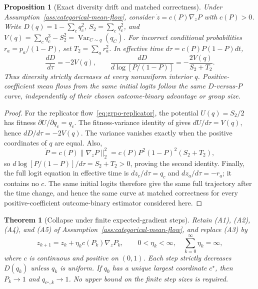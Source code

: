 \documentclass{article}
\newcommand{\enforcehalffinalproseline}{%
  \setlength{\parfillskip}{0pt plus .20\linewidth}}
\newcommand{\1}{\mathbf 1}
\newtheorem{theorem}[lemma]{Theorem}
\newtheorem{proposition}[lemma]{Proposition}
\theoremstyle{remark}
\theoremstyle{definition}
\theoremstyle{plain}
\begin{document}
\begin{proposition}[Exact diversity drift and matched correctness]
\enforcehalffinalproseline
\label{prop:pcmd-drift}
Under Assumption~\ref{ass:categorical-mean-flow}, consider
$\dot z=c(P)\nabla_zP$ with $c(P)>0$. Write
$D(q)=1-\sum_cq_c^2$, $S_2=\sum_cq_c^2$, and
$V(q)=\sum_cq_c^3-S_2^2=\operatorname{Var}_{C\sim q}(q_C)$.
For incorrect conditional probabilities $r_a=p_a/(1-P)$, set
$T_2=\sum_ar_a^2$. In effective time $d\tau=c(P)P(1-P)dt$,
\begin{equation}
 \frac{dD}{d\tau}=-2V(q),
 \qquad
 \frac{dD}{d\log[P/(1-P)]}
 =-\frac{2V(q)}{S_2+T_2}.
 \label{eq:pcmd-drift}
\end{equation}
Thus diversity strictly decreases at every nonuniform interior $q$.
Positive-coefficient mean flows from the same initial logits follow the same
$D$-versus-$P$ curve, independently of their chosen outcome-binary advantage or
group size.
\end{proposition}

\begin{proof}
\enforcehalffinalproseline
For the replicator flow~\eqref{eq:grpo-replicator}, the potential
$U(q)=S_2/2$ has fitness $\partial U/\partial q_c=q_c$.
The fitness-variance identity of
\citet[Theorems~1--2]{harper2009informationgeometry} gives
$dU/d\tau=V(q)$, hence $dD/d\tau=-2V(q)$.
The variance vanishes exactly when the
positive coordinates of $q$ are equal. Also,
\[
 \dot P=c(P)\|\nabla_zP\|_2^2
       =c(P)P^2(1-P)^2(S_2+T_2),
\]
so $d\log[P/(1-P)]/d\tau=S_2+T_2>0$, proving the second identity.
Finally, the full logit equation in effective time is
$dz_c/d\tau=q_c$ and $dz_a/d\tau=-r_a$; it contains no $c$.
The same initial logits therefore give the same full trajectory after the
time change, and hence the same curve at matched correctness for every positive-coefficient outcome-binary estimator considered here.
\end{proof}

\begin{theorem}[Collapse under finite expected-gradient steps]
\enforcehalffinalproseline
\label{thm:finite-expected-steps}
Retain (A1), (A2), (A4), and (A5) of
Assumption~\ref{ass:categorical-mean-flow}, and replace (A3) by
\begin{equation}
 z_{k+1}=z_k+\eta_k c(P_k)\nabla_zP_k,
 \qquad 0<\eta_k<\infty,\quad \sum_{k=0}^\infty\eta_k=\infty,
 \label{eq:finite-expected-update}
\end{equation}
where $c$ is continuous and positive on $(0,1)$. Each step strictly decreases
$D(q_k)$ unless $q_k$ is uniform. If $q_0$ has a unique largest coordinate
$c^\star$, then $P_k\to1$ and $q_{c^\star,k}\to1$.
No upper bound on the finite step sizes is required.
\end{theorem}
\end{document}

